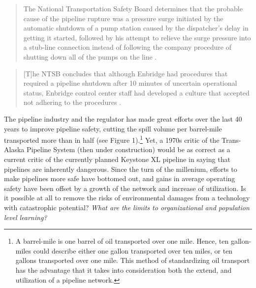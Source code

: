 \begin{quote}
	The National Transportation Safety Board determines that the probable cause of the pipeline rupture was a pressure surge initiated by the automatic shutdown of a pump station caused by the dispatcher's delay in getting it started, followed by his attempt to relieve the surge pressure into a stub-line connection instead of following the company procedure of shutting down all of the pumps on the line \citep{NTSB1981}.
\end{quote}

\begin{quote}
	[T]he NTSB concludes that although Enbridge had procedures that required a pipeline shutdown after 10 minutes of uncertain operational status, Enbridge control center staff had developed a culture that accepted not adhering to the procedures \citep{NTSB2012}.
\end{quote}

The pipeline industry and the regulator has made great efforts over the last 40 years to improve pipeline safety, cutting the spill volume per barrel-mile transported more than in half (see Figure 1).\footnote{A barrel-mile is one barrel of oil transported over one mile. Hence, ten gallon-miles could describe either one gallon transported over ten miles, or ten gallons transported over one mile. This method of standardizing oil transport has the advantage that it takes into consideration both the extend, and utilization of a pipeline network.} Yet, a 1970s critic of the Trans-Alaska Pipeline System (then under construction) would be as correct as a current critic of the currently planned Keystone XL pipeline in saying that pipelines are inherently dangerous. Since the turn of the millenium, efforts to make pipelines more safe have bottomed out, and gains in average operating safety have been offset by a growth of the network and increase of utilization. Is it possible at all to remove the risks of environmental damages from a technology with catastrophic potential? \textit{What are the limits to organizational and population level learning?}

